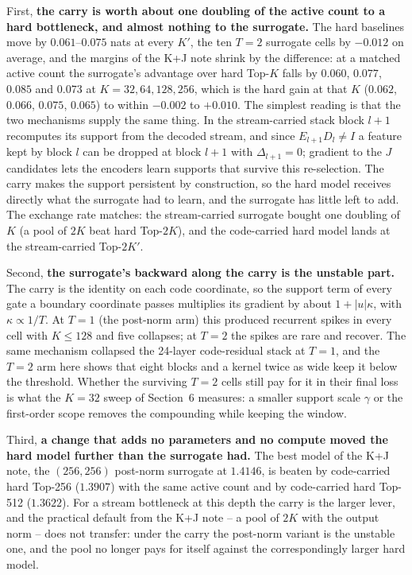 \documentclass[11pt,a4paper]{article}
\newcommand{\Kp}{K'}
\begin{document}
First, \textbf{the carry is worth about one doubling of the active count to
a hard bottleneck, and almost nothing to the surrogate.} The hard baselines
move by $0.061$--$0.075$ nats at every $\Kp$, the ten $T=2$ surrogate cells
by $-0.012$ on average, and the margins of the K+J note shrink by the
difference: at a matched active count the surrogate's advantage over hard
Top-$K$ falls by $0.060$, $0.077$, $0.085$ and $0.073$ at $K = 32, 64, 128,
256$, which is the hard gain at that $K$ ($0.062$, $0.066$, $0.075$,
$0.065$) to within $-0.002$ to $+0.010$. The simplest reading is
that the two mechanisms supply the same thing. In the stream-carried stack
block $l{+}1$ recomputes its support from the decoded stream, and since
$E_{l+1} D_l \ne I$ a feature kept by block $l$ can be dropped at block
$l{+}1$ with $\Delta_{l+1} = 0$; gradient to the $J$ candidates lets the
encoders learn supports that survive this re-selection. The carry makes the
support persistent by construction, so the hard model receives directly what
the surrogate had to learn, and the surrogate has little left to add. The
exchange rate matches: the stream-carried surrogate bought one doubling of
$K$ (a pool of $2K$ beat hard Top-$2K$), and the code-carried hard model
lands at the stream-carried Top-$2\Kp$.

Second, \textbf{the surrogate's backward along the carry is the unstable
part.} The carry is the identity on each code coordinate, so the support
term of every gate a boundary coordinate passes multiplies its gradient by
about $1 + |u|\kappa$, with $\kappa \propto 1/T$. At $T=1$ (the post-norm
arm) this produced recurrent spikes in every cell with $K \le 128$ and five
collapses; at $T=2$ the spikes are rare and recover. The same mechanism
collapsed the 24-layer code-residual stack at $T=1$, and the $T=2$ arm here
shows that eight blocks and a kernel twice as wide keep it below the
threshold. Whether the surviving $T=2$ cells still pay for it in their final
loss is what the $K=32$ sweep of Section~6 measures: a smaller support scale
$\gamma$ or the first-order scope removes the compounding while keeping the
window.

Third, \textbf{a change that adds no parameters and no compute moved the
hard model further than the surrogate had.} The best model of the
K+J note, the $(256,256)$ post-norm surrogate at $1.4146$, is beaten by
code-carried hard Top-256 ($1.3907$) with the same active count and by
code-carried hard Top-512 ($1.3622$). For a stream bottleneck at this depth
the carry is the larger lever, and the practical default from the K+J note
-- a pool of $2K$ with the output norm -- does not transfer: under the carry
the post-norm variant is the unstable one, and the pool no longer pays for
itself against the correspondingly larger hard model.
\end{document}
